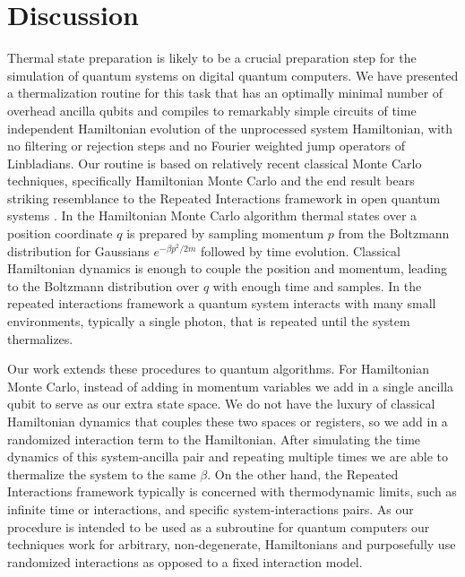 \section{Discussion} \label{sec:tsp_discussion}

Thermal state preparation is likely to be a crucial preparation step for the simulation of quantum systems on digital quantum computers. We have presented a thermalization routine for this task that has an optimally minimal number of overhead ancilla qubits and compiles to remarkably simple circuits of time independent Hamiltonian evolution of the unprocessed system Hamiltonian, with no filtering or rejection steps and no Fourier weighted jump operators of Linbladians. Our routine is based on relatively recent classical Monte Carlo techniques, specifically Hamiltonian Monte Carlo \cite{hoffman2011nouturnsampleradaptivelysetting} and the end result bears striking resemblance to the Repeated Interactions framework in open quantum systems \cite{prositto2025equilibrium}. In the Hamiltonian Monte Carlo algorithm thermal states over a position coordinate $q$ is prepared by sampling momentum $p$ from the Boltzmann distribution for Gaussians $e^{-\beta p^2/2m}$ followed by time evolution. Classical Hamiltonian dynamics is enough to couple the position and momentum, leading to the Boltzmann distribution over $q$ with enough time and samples. In the repeated interactions framework a quantum system interacts with many small environments, typically a single photon, that is repeated until the system thermalizes. 

Our work extends these procedures to quantum algorithms. For Hamiltonian Monte Carlo, instead of adding in momentum variables we add in a single ancilla qubit to serve as our extra state space. We do not have the luxury of classical Hamiltonian dynamics that couples these two spaces or registers, so we add in a randomized interaction term to the Hamiltonian. After simulating the time dynamics of this system-ancilla pair and repeating multiple times we are able to thermalize the system to the same $\beta$. On the other hand, the Repeated Interactions framework typically is concerned with thermodynamic limits, such as infinite time or interactions, and specific system-interactions pairs. As our procedure is intended to be used as a subroutine for quantum computers our techniques work for arbitrary, non-degenerate, Hamiltonians and purposefully use randomized interactions as opposed to a fixed interaction model.

